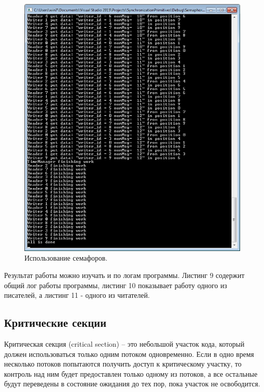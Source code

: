 \documentclass[a4paper, 12pt]{article}		%
\begin{document}
\begin{figure}[h!]
\centering
\includegraphics[scale=0.85]{res/002}
\caption{Использование семафоров.}
\end{figure}

\newpage
Результат работы можно изучать и по логам программы. Листинг 9 содержит общий лог работы программы, листинг 10 показывает работу одного из писателей, а листинг 11 - одного из читателей.


\newpage





\newpage
\subsection{Критические секции}

Критическая секция (critical section) -- это небольшой участок кода, который должен использоваться только одним потоком одновременно. Если в одно время несколько потоков попытаются получить доступ к критическому участку, то контроль над ним будет предоставлен только одному из потоков, а все остальные будут переведены в состояние ожидания до тех пор, пока участок не освободится\cite{Schupak}.
\end{document}
